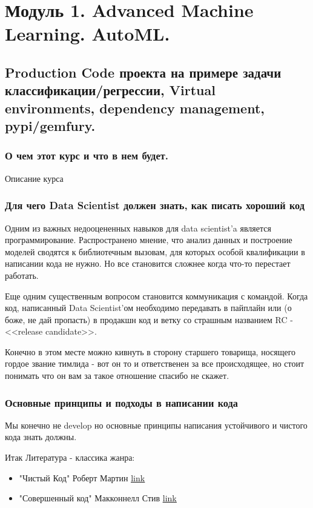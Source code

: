\chapter{Модуль 1. Advanced Machine Learning. AutoML.}
\section{Production Code проекта на примере задачи классификации/регрессии, Virtual environments, dependency management, pypi/gemfury.}
\subsection{О чем этот курс и что в нем будет.}
Описание курса

\subsection{Для чего Data Scientist должен знать, как писать хороший код}
Одним из важных недооцененных навыков для data scientist'a является программирование. Распространено мнение, что анализ данных и построение моделей сводятся к библиотечным вызовам, для которых особой квалификации в написании кода не нужно. Но все становится сложнее когда что-то перестает работать.

Еще одним существенным вопросом становится коммуникация с командой. Когда код, написанный Data Scientist'ом необходимо передавать в пайплайн или (о боже, не дай пропасть) в продакшн код и ветку со страшным названием RC - <<release candidate>>.

Конечно в этом месте можно кивнуть в сторону старшего товарища, носящего гордое звание тимлида - вот он то и ответственен за все происходящее, но стоит понимать что он вам за такое отношение спасибо не скажет.

\subsection{Основные принципы и подходы в написании кода}
Мы конечно не develop но основные принципы написания устойчивого и чистого кода знать должны. 

Итак Литература - классика жанра:

\begin{itemize}
	\item "Чистый Код" Роберт Мартин \href{https://drive.google.com/file/d/17FB3zrdbIRuGB2kldV6aTbhxV7MUbpge/view?usp=share_link}{\underline{link}}
	\item "Совершенный код" Макконнелл Стив \href{https://drive.google.com/file/d/1IP00THrVip-Fp5eY_vu5nvYkAEPZGEWl/view?usp=share_link}{\underline{link}}
\end{itemize}

